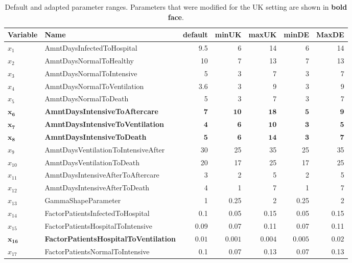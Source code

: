 \documentclass[conference]{IEEEtran}
\begin{document}
\begin{table}[ht]\label{tab:para}
\caption{Default and adapted parameter ranges. Parameters that were  modified for the UK setting are shown in \textbf{bold face}.}
\centering
\begin{tabular}{llrrrrr}
  \hline
Variable & Name & default & minUK & maxUK & minDE & MaxDE \\ 
  \hline
$x_1$&  AmntDaysInfectedToHospital & 9.5 &   6 &  14 &   6 &  14 \\
$x_2$&   AmntDaysNormalToHealthy&  10 &   7 &  13 &   7 &  13 \\
$x_3$&   AmntDaysNormalToIntensive &   5 &   3 &   7 &   3 &   7 \\ 
$x_4$&  AmntDaysNormalToVentilation & 3.6 &   3 &   9 &   3 &   9 \\ 
$x_5$&   AmntDaysNormalToDeath&   5 &   3 &   7 &   3 &   7 \\  
$ \mathbf{x_6}$&   \textbf{AmntDaysIntensiveToAftercare} & $\mathbf{7}$ & $\mathbf{10}$ & $\mathbf{18}$ & $\mathbf{5}$ & $\mathbf{9}$ \\ 
$\mathbf{x_7}$ &   \textbf{AmntDaysIntensiveToVentilation} & $\mathbf{4}$ & $\mathbf{6}$ & $\mathbf{10}$ & $\mathbf{3}$ & $\mathbf{5}$ \\ 
$\mathbf{x_8}$&   \textbf{AmntDaysIntensiveToDeath} & $\mathbf{5}$ & $\mathbf{6}$ & $\mathbf{14}$ & $\mathbf{3}$  & $\mathbf{7}$ \\ 
$x_9$&   AmntDaysVentilationToIntensiveAfter &  30 &  25 &  35 &  25 &  35 \\ 
$x_{10}$&   AmntDaysVentilationToDeath  &  20 &  17 &  25 &  17 &  25 \\  
$x_{11}$&   AmntDaysIntensiveAfterToAftercare &   3 &   2 &   5 &   2 &   5 \\ 
$x_{12}$&   AmntDaysIntensiveAfterToDeath &   4 &   1 &   7 &   1 &   7 \\ 
$x_{13}$&   GammaShapeParameter &   1 & 0.25 &   2 & 0.25 &   2 \\ 
$x_{14}$&   FactorPatientsInfectedToHospital & 0.1 & 0.05 & 0.15 & 0.05 & 0.15 \\ 
$x_{15}$&   FactorPatientsHospitalToIntensive & 0.09 & 0.07 & 0.11 & 0.07 & 0.11 \\ 
$ \mathbf{x_{16}}$ & \textbf{FactorPatientsHospitalToVentilation} & $ \mathbf{0.01}$ & $ \mathbf{0.001}$ & $ \mathbf{0.004} $& $ \mathbf{0.005}$ & $ \mathbf{0.02}$ \\ 
$x_{17}$&   FactorPatientsNormalToIntensive & 0.1 & 0.07 & 0.13 & 0.07 & 0.13 \\ 

\end{tabular}
\end{table}
\end{document}
